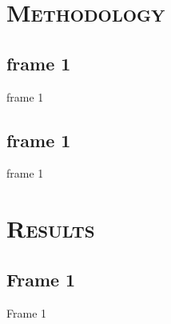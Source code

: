 \documentclass[xcolor=x11names,compress]{beamer}
\renewcommand{\(}{\begin{columns}}
\renewcommand{\)}{\end{columns}}
\newcommand{\<}[1]{\begin{column}{#1}}
\renewcommand{\>}{\end{column}}
\begin{document}


\section{\scshape Methodology}
\subsection{frame 1}
\begin{frame}{frame 1}

\end{frame}


\subsection{frame 1}
\begin{frame}{frame 1}

\end{frame}

\section{\scshape Results}
\subsection{Frame 1}
\begin{frame}{Frame 1}

\end{frame}
\end{document}
